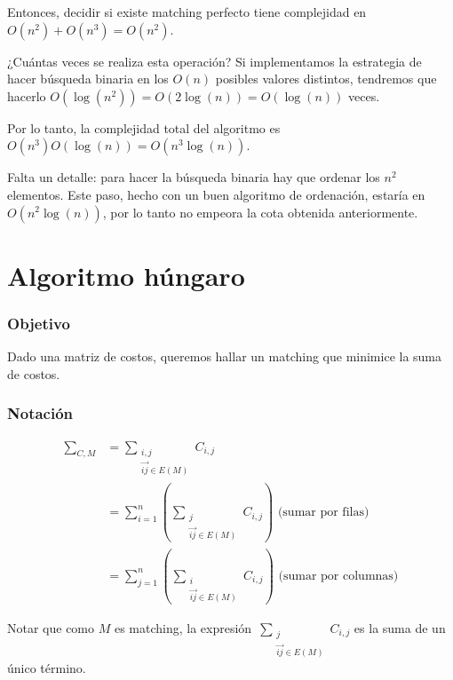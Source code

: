 \documentclass[10pt,a4paper]{article}
\begin{document}
Entonces, decidir si existe matching perfecto tiene complejidad en $O(n^2) + O(n^3) = O(n^2)$.

¿Cuántas veces se realiza esta operación? Si implementamos la estrategia de hacer búsqueda binaria en los $O(n)$ posibles valores distintos, tendremos que hacerlo $O(\log(n^2)) = O(2\log(n)) = O(\log(n))$ veces.

Por lo tanto, la complejidad total del algoritmo es $O(n^3) O (\log(n))= O(n^3\log(n))$.

Falta un detalle: para hacer la búsqueda binaria hay que ordenar los $n^2 $ elementos. Este paso, hecho con un buen algoritmo de ordenación, estaría en $O(n^2\log(n))$, por lo tanto no empeora la cota obtenida anteriormente.

\section*{Algoritmo húngaro}

\subsubsection*{Objetivo}

Dado una matriz de costos, queremos hallar un matching que minimice la suma de costos.

\subsubsection*{Notación}

\begin{center}
\begin{align*} \sum\limits_{C,M} &= \sum\limits_{\substack{i, j\\\overrightarrow{ij} \in E(M)}} C_{i,j} \\ &= \sum\limits_{i = 1}^n \left( \sum\limits_{\substack{j\\ \overrightarrow{ij} \in E(M)}} C_{i,j}\right) \text{ (sumar por filas)}\\ &= \sum\limits_{j = 1}^n \left( \sum\limits_{\substack{i\\ \overrightarrow{ij} \in E(M)}} C_{i,j}\right) \text{ (sumar por columnas)} \end{align*}
\end{center}

Notar que como $M$ es matching, la expresión $\sum\limits_{\substack{j\\ \overrightarrow{ij} \in E(M)}} C_{i,j}$ es la suma de un único término.
\end{document}
